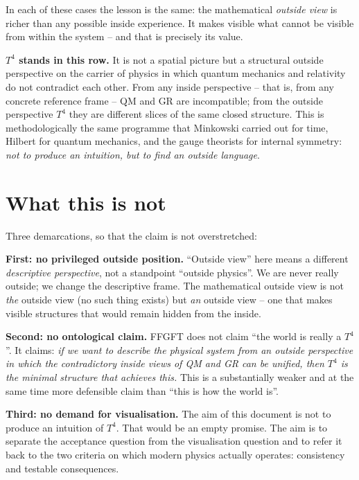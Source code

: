 In each of these cases the lesson is the same: the mathematical
\emph{outside view} is richer than any possible inside experience.
It makes visible what cannot be visible from within the system --
and that is precisely its value.

\textbf{$T^4$ stands in this row.} It is not a spatial picture but a
structural outside perspective on the carrier of physics in which
quantum mechanics and relativity do not contradict each other. From
any inside perspective -- that is, from any concrete reference
frame -- QM and GR are incompatible; from the outside perspective
$T^4$ they are different slices of the same closed structure. This
is methodologically the same programme that Minkowski carried out
for time, Hilbert for quantum mechanics, and the gauge theorists for
internal symmetry: \emph{not to produce an intuition, but to find an
outside language}.

\section{What this is not}

Three demarcations, so that the claim is not overstretched:

\textbf{First: no privileged outside position.} ``Outside view'' here
means a different \emph{descriptive perspective}, not a standpoint
``outside physics''. We are never really outside; we change the
descriptive frame. The mathematical outside view is not \emph{the}
outside view (no such thing exists) but \emph{an} outside view -- one
that makes visible structures that would remain hidden from the
inside.

\textbf{Second: no ontological claim.} FFGFT does not claim ``the
world is really a $T^4$''. It claims: \emph{if we want to describe
the physical system from an outside perspective in which the
contradictory inside views of QM and GR can be unified, then $T^4$ is
the minimal structure that achieves this.} This is a substantially
weaker and at the same time more defensible claim than ``this is how
the world is''.

\textbf{Third: no demand for visualisation.} The aim of this document
is not to produce an intuition of $T^4$. That would be an empty
promise. The aim is to separate the acceptance question from the
visualisation question and to refer it back to the two criteria on
which modern physics actually operates: consistency and testable
consequences.

